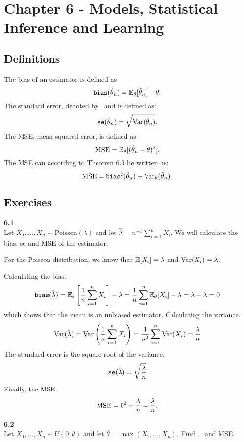 
\newpage
\section{Chapter 6 - Models, Statistical Inference and Learning}

\subsection*{Definitions}
\noindent The bias of an estimator is defined as
$$
\texttt{bias}(\hat{\theta}_n) = \mathbb{E}_\theta[\hat{\theta}_n] - \theta.
$$
The standard error, denoted by \se\, and is defined as:
$$
\texttt{se}(\hat{\theta}_n) = \sqrt{\text{Var}(\hat{\theta}_n)}.
$$
The MSE, mean squared error, is defined as:
$$
\text{MSE} = \mathbb{E}_\theta[(\hat{\theta}_n - \theta)^2].
$$
The MSE can according to Theorem 6.9 be written as:
$$
\text{MSE} = \texttt{bias}^2(\hat{\theta}_n) + \text{Var}_\theta(\hat{\theta}_n).
$$

\subsection*{Exercises}

\bigskip\noindent
\textbf{6.1}\\  %
Let $X_1,\ldots,X_n\sim\text{Poisson}(\lambda)$ and let
$\hat{\lambda} = n^{-1}\sum_{i=1}^nX_i$. We will calculate the bias, se and MSE
of the estimator.

For the Poisson distribution, we know that $\mathbb{E}[X_i] = \lambda$ and $\text{Var}(X_i) = \lambda$.

\medskip\noindent Calculating the bias.
$$
\texttt{bias}(\hat{\lambda}) = \mathbb{E}_\theta\left[\frac{1}{n}\sum_{i=1}^nX_i\right] - \lambda
= \frac{1}{n}\sum_{i=1}^n\mathbb{E}_\theta[X_i] - \lambda = \lambda - \lambda = 0
$$
which shows that the mean is an unbiased estimator. Calculating the variance.
$$
\text{Var}(\hat{\lambda}) = \text{Var}\left(\frac{1}{n}\sum_{i=1}^nX_i\right) =
\frac{1}{n^2}\sum_{i=1}^n\text{Var}(X_i) = \frac{\lambda}{n}
$$
The standard error is the square root of the variance.
$$
\texttt{se}(\hat{\lambda}) = \sqrt{\frac{\lambda}{n}}
$$
Finally, the MSE.
$$
\text{MSE} = 0^2 + \frac{\lambda}{n} = \frac{\lambda}{n}.
$$

\newpage\noindent
\textbf{6.2}\\  %
Let $X_1,\ldots,X_n \sim U(0,\theta)$ and let $\hat{\theta} = \max(X_1,\ldots, X_n)$.
Find \bias, \se\, and MSE.

